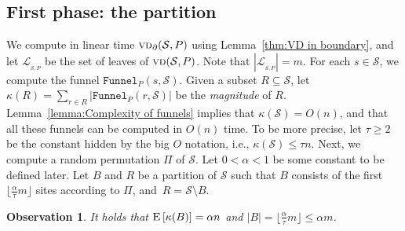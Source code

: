 \documentclass[a4paper, 11pt]{article}
\newtheorem{observation}[theorem]{Observation}
\newcommand{\s}{\mathcal S}
\newcommand{\funnel}[2][P]{\ensuremath{\mathtt{Funnel}_{\scriptscriptstyle #1}(#2)}}
\newcommand{\vd}[2][P]{\textsc{vd}(#2, #1)}
\newcommand{\cost}[1]{\kappa(#1)}
\newcommand{\bvd}[2][P]{\textsc{vd}_{\partial}(#2, #1)}
\newcommand{\ex}[1]{\textsc{E}\left[#1\right]}
\newcommand{\LL}[1][\s, P]{\ensuremath{\mathcal L_{_{#1}}}}
\begin{document}
\subsection{First phase: the partition}\label{section:First phase}
We compute in linear time $\bvd{\s}$ using Lemma~\ref{thm:VD in boundary}, and let $\LL$ be the set of leaves of $\vd{\s}$. Note that $|\LL| = m$. 
For each $s\in \s$, we compute the funnel $\funnel{s, \s}$. 
Given a subset $R\subseteq \s$, let $\cost{R} = \sum_{r\in R} |\funnel{r, \s}|$ be the \emph{magnitude} of $R$. 
Lemma~\ref{lemma:Complexity of funnels} implies that $\cost{\s} = O(n)$, and that all these funnels can be computed in $O(n)$ time. 
To be more precise, let $\tau\geq 2$ be the constant hidden by the big $O$ notation, i.e., $\cost{\s} \leq \tau n$. 
Next, we compute a random permutation $\Pi$ of $\s$. 
Let $0 < \alpha < 1$ be some constant to be defined later. 
Let $B$ and $R$ be a partition of $\s$ such that $B$ consists of the first $\lfloor \frac{\alpha}{\tau} m\rfloor$ sites according to $\Pi$, and~$R = \s\setminus B$. 

\begin{observation}\label{obs: Complexity of B and R}
It holds that $\ex{\cost{B}} = \alpha n$ and $|B|= \lfloor \frac{\alpha}{\tau} m\rfloor \leq \alpha m$. 
\end{observation}

\end{document}
